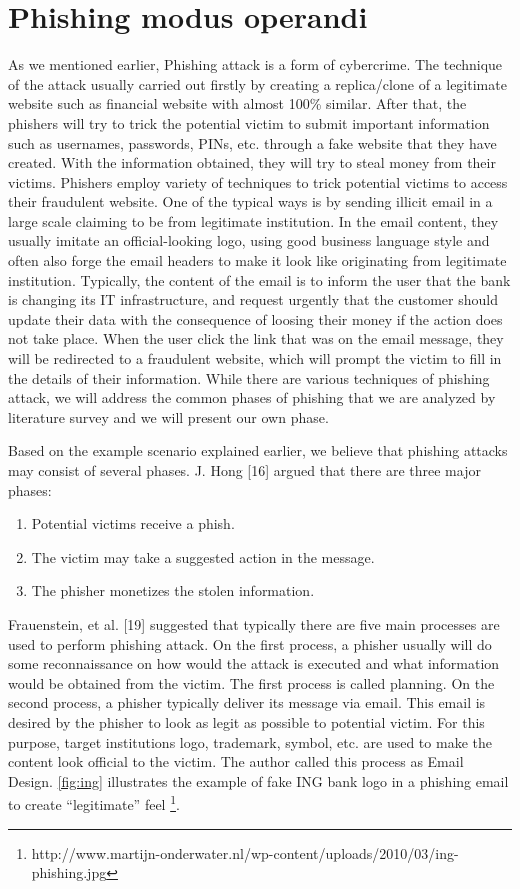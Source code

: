 \section{Phishing modus operandi}

As we mentioned earlier, Phishing attack is a form of cybercrime.
The technique of the attack usually carried out firstly by creating
a replica/clone of a legitimate website such as financial website
with almost 100\% similar. After that, the phishers will try to trick
the potential victim to submit important information such as usernames,
passwords, PINs, etc. through a fake website that they have created.
With the information obtained, they will try to steal money from their
victims. Phishers employ variety of techniques to trick potential
victims to access their fraudulent website. One of the typical ways
is by sending illicit email in a large scale claiming to be from legitimate
institution. In the email content, they usually imitate an official-looking
logo, using good business language style and often also forge the
email headers to make it look like originating from legitimate institution.
Typically, the content of the email is to inform the user that the
bank is changing its IT infrastructure, and request urgently that
the customer should update their data with the consequence of loosing
their money if the action does not take place. When the user click
the link that was on the email message, they will be redirected to
a fraudulent website, which will prompt the victim to fill in the
details of their information. While there are various techniques of
phishing attack, we will address the common phases of phishing that
we are analyzed by literature survey and we will present our own phase. 

Based on the example scenario explained earlier, we believe that phishing
attacks may consist of several phases. J. Hong {[}16{]} argued that
there are three major phases:
\begin{enumerate}
\item Potential victims receive a phish.
\item The victim may take a suggested action in the message.
\item The phisher monetizes the stolen information.
\end{enumerate}
Frauenstein, et al. {[}19{]} suggested that typically there are five
main processes are used to perform phishing attack. On the first process,
a phisher usually will do some reconnaissance on how would the attack
is executed and what information would be obtained from the victim.
The first process is called planning. On the second process, a phisher
typically deliver its message via email. This email is desired by
the phisher to look as legit as possible to potential victim. For
this purpose, target institutions logo, trademark, symbol, etc. are
used to make the content look official to the victim. The author called
this process as Email Design. \autoref{fig:ing} illustrates the example
of fake ING bank logo in a phishing email to create \textquotedblleft legitimate\textquotedblright{}
feel%
\footnote{http://www.martijn-onderwater.nl/wp-content/uploads/2010/03/ing-phishing.jpg%
}.

